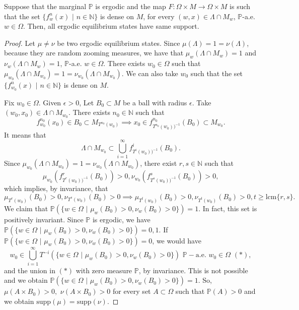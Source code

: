 \documentclass[10pt,a4paper]{amsart}
\begin{document}
	\begin{lemma}
		Suppose that the marginal $\mathbb{P}$ is ergodic and the map $F : \Omega \times M \to \Omega \times M$ is such that the set $\{f^{n}_{w}(x) \,\, | \,\, n \in \mathbb{N}\}$ is dense on $M$, for every $(w,x) \in \Lambda \cap M_{w}$,  $\mathbb{P}$-a.e. $w \in \Omega$. Then, all ergodic equilibrium states have same support.
	\end{lemma}

	\begin{proof}
		Let $\mu \neq \nu$ be two ergodic equilibrium states. Since $\mu(\Lambda) = 1 = \nu(\Lambda)$, because they are random zooming measures, we have that $\mu_{w}(\Lambda \cap M_{w})= 1$ and $ \nu_{w}(\Lambda \cap M_{w}) = 1$, $\mathbb{P}$-a.e. $w \in \Omega$. There exists $w_{0} \in \Omega$ such that $\mu_{w_{0}}(\Lambda \cap M_{w_{0}})= 1 = \nu_{w_{0}}(\Lambda \cap M_{w_{0}})$. We can also take $w_{0}$ such that the set $\{f^{n}_{w_{0}}(x) \,\, | \,\, n \in \mathbb{N}\}$ is dense on $M$. 
		
		Fix $w_{0} \in \Omega$. Given $\epsilon > 0$, Let $B_{0} \subset M$ be a ball with radius $\epsilon$. Take $(w_{0}, x_{0}) \in \Lambda \cap M_{w_{0}}$. There exists $n_{0} \in \mathbb{N}$ such that
		\[
		f^{n_{0}}_{w_{0}}(x_{0}) \in B_{0} \subset M_{T^{n_{0}}(w_{0})} \implies x_{0} \in f^{n_{0}}_{T^{n_{0}}(w_{0}))^{-1}}(B_{0}) \subset M_{w_{0}}.	
		\]
		It means that
		\[
		\Lambda \cap M_{w_{0}} \subset \bigcup_{i=1}^{\infty} f^{i}_{T^{i}(w_{0}))^{-1}}(B_{0}).
		\]
		Since $\mu_{w_{0}}(\Lambda \cap M_{w_{0}})= 1 = \nu_{w_{0}}(\Lambda \cap M_{w_{0}})$, there exist $r,s \in \mathbb{N}$ such that
		\[
		\mu_{w_{0}}(f^{r}_{T^{r}(w_{0}))^{-1}}(B_{0}))> 0, \nu_{w_{0}}(f^{s}_{T^{s}(w_{0}))^{-1}}(B_{0}))> 0,
		\]
		which implies, by invariance, that
		\[
		\mu_{T^{r}(w_{0})}(B_{0})> 0, \nu_{T^{s}(w_{0})}(B_{0})> 0 \implies \mu_{T^{t}(w_{0})}(B_{0})> 0, \nu_{T^{t}(w_{0})}(B_{0})> 0, t \geq \text{lcm}\{r,s\}.
		\]
		We claim that  $\mathbb{P}(\{w \in \Omega \,\, | \,\, \mu_{w}(B_{0}) > 0, \nu_{w}(B_{0}) > 0\}) = 1$.  In fact, this set is positively invariant. Since $\mathbb{P}$ is ergodic, we have $\mathbb{P}(\{w \in \Omega \,\, | \,\, \mu_{w}(B_{0}) > 0, \nu_{w}(B_{0}) > 0\}) = 0,1$. If $\mathbb{P}(\{w \in \Omega \,\, | \,\, \mu_{w}(B_{0}) > 0, \nu_{w}(B_{0}) > 0\}) =0$, we would have 
		\[
		w_{0} \in \bigcup_{i=1}^{\infty}T^{-i}(\{w \in \Omega \,\, | \,\, \mu_{w}(B_{0}) > 0, \nu_{w}(B_{0}) > 0\}) \,\, \mathbb{P}-\text{a.e.} \,\, w_{0} \in \Omega \,\, (*),
		\]
		and the union in $(*)$ with zero measure $\mathbb{P}$, by invariance. This is not possible and we obtain $\mathbb{P}(\{w \in \Omega \,\, | \,\, \mu_{w}(B_{0}) > 0, \nu_{w}(B_{0}) > 0\}) = 1$. So, $\mu(A \times B_{0}) > 0, \,\, \nu(A \times B_{0}) > 0$ for every set $A \subset \Omega$ such that $\mathbb{P}(A) > 0$ and we obtain $\text{supp}(\mu) = \text{supp}(\nu)$. 
	\end{proof}
\end{document}
